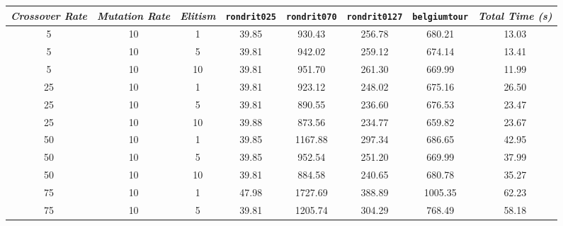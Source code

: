 
\begin{table}[H]
\centering

\footnotesize
{\renewcommand{\arraystretch}{1}}
\begin{tabular}{ccc|c|c|c|c|c}
\textit{Crossover Rate} & \textit{Mutation Rate} & \textit{Elitism} & \texttt{rondrit025} & \texttt{rondrit070} & \texttt{rondrit0127} & \texttt{belgiumtour} & \textit{Total Time (s)} \\\hline
5 & 10 & 1 & \cellcolor{gray!50}39.85 & \cellcolor{gray!16}930.43 & \cellcolor{gray!1}256.78 & \cellcolor{gray!44}680.21 & 13.03\\
5 & 10 & 5 & \cellcolor{gray!50}39.81 & \cellcolor{gray!14}942.02 & \cellcolor{gray!1}259.12 & \cellcolor{gray!46}674.14 & 13.41\\
5 & 10 & 10 & \cellcolor{gray!50}39.81 & \cellcolor{gray!13}951.70 & \cellcolor{gray!1}261.30 & \cellcolor{gray!47}669.99 & 11.99\\
25 & 10 & 1 & \cellcolor{gray!50}39.81 & \cellcolor{gray!18}923.12 & \cellcolor{gray!1}248.02 & \cellcolor{gray!46}675.16 & 26.50\\
25 & 10 & 5 & \cellcolor{gray!50}39.81 & \cellcolor{gray!23}890.55 & \cellcolor{gray!1}236.60 & \cellcolor{gray!45}676.53 & 23.47\\
25 & 10 & 10 & \cellcolor{gray!50}39.88 & \cellcolor{gray!26}873.56 & \cellcolor{gray!1}234.77 & \cellcolor{gray!50}659.82 & 23.67\\
50 & 10 & 1 & \cellcolor{gray!50}39.85 & \cellcolor{gray!1}1167.88 & \cellcolor{gray!1}297.34 & \cellcolor{gray!42}686.65 & 42.95\\
50 & 10 & 5 & \cellcolor{gray!50}39.85 & \cellcolor{gray!13}952.54 & \cellcolor{gray!1}251.20 & \cellcolor{gray!47}669.99 & 37.99\\
50 & 10 & 10 & \cellcolor{gray!50}39.81 & \cellcolor{gray!24}884.58 & \cellcolor{gray!1}240.65 & \cellcolor{gray!44}680.78 & 35.27\\
75 & 10 & 1 & \cellcolor{gray!1}47.98 & \cellcolor{gray!1}1727.69 & \cellcolor{gray!1}388.89 & \cellcolor{gray!1}1005.35 & 62.23\\
75 & 10 & 5 & \cellcolor{gray!50}39.81 & \cellcolor{gray!1}1205.74 & \cellcolor{gray!1}304.29 & \cellcolor{gray!17}768.49 & 58.18\\

\end{tabular}
\end{table}
